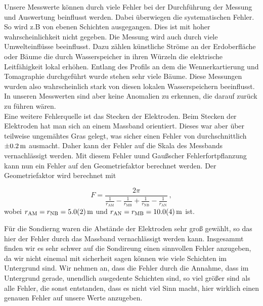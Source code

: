 Unsere Messwerte können durch viele Fehler bei der Durchführung der Messung und Auswertung beinflusst werden. Dabei überwiegen die systematischen Fehler. So wird z.B von ebenen Schichten ausgegangen. Dies ist mit hoher wahrscheinlichkeit nicht gegeben. 
Die Messung wird auch durch viele Umwelteinflüsse beeinflusst. Dazu zählen künstliche Ströme an der Erdoberfläche oder Bäume die durch Wasserspeicher in ihren Würzeln die elektrische Leitfähigkeit lokal erhöhen. Entlang des Profils an dem die Wennerkartierung und Tomagraphie durchgeführt wurde stehen sehr viele Bäume. Diese Messungen wurden also wahrscheinlich stark von diesen lokalen Wasserspeichern beeinflusst. In unseren Messwerten sind aber keine Anomalien zu erkennen, die darauf zurück zu führen wären.\\
Eine weitere Fehlerquelle ist das Stecken der Elektroden. Beim Stecken der Elektroden hat man sich an einem Massband orientiert. Dieses war aber über teilweise ungemähtes Gras gelegt, was sicher einen Fehler von durchschnittlich  $\SI{\pm 0,2}{m}$ ausmacht. Daher kann der Fehler auf die Skala des Messbands vernachlässigt werden.  
Mit diesem Fehler uund Gaußscher Fehlerfortpflanzung kann nun ein Fehler auf den Geometriefaktor berechnet werden. Der Geometriefaktor wird berechnet mit 

$$F = \frac{2 \pi}{\frac{1}{r_{\mathrm{AM}}} - \frac{1}{r_{\mathrm{MB}}} + \frac{1}{r_{\mathrm{NB}}} - \frac{1}{r_{\mathrm{AN}}}}\,,$$
wobei $ r_\mathrm{AM} = r_\mathrm{NB} = \SI{5 \pm 0.2}{m}$  und $ r_{\mathrm{AN}} =  r_{\mathrm{MB}} = \SI{10 \pm 0.4}{m}$ ist.




Für die Sondierng waren die Abstände der Elektroden sehr groß gewählt, so das hier der Fehler durch das Massband vernachlässigt werden kann. Insgesammt finden wir es sehr schwer auf die Sondireung einen sinnvollen Fehler anzugeben, da wir nicht einemal mit sicherheit sagen können wie viele Schichten im Untergrund sind. Wir nehmen an, dass die Fehler durch die Annahme, dass im Untergrund gerade, unendlich ausgedente Schichten sind, so viel größer sind als alle Fehler, die sonst entstanden, dass es nicht viel Sinn macht, hier wirklich einen genauen Fehler auf unsere Werte anzugeben.

